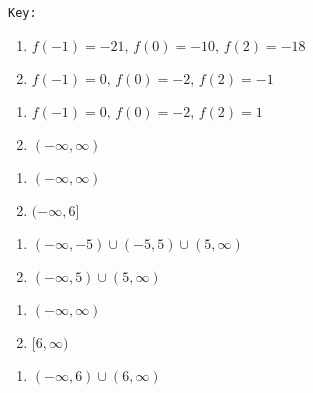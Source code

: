 \documentclass{article}
\newcounter{key}
\begin{document}
\vfill 

\dotfill \newline 
\texttt{Key:}
\begin{multicols}{2}
\begin{enumerate}   
    \item $f(-1) = -21, \, f(0) = -10, \, f(2) = -18$
    \item $f(-1) = 0, \, f(0) = -2, \, f(2) = -1$
\end{enumerate}     \setcounter{key}{\value{enumi}}
\end{multicols}
\begin{multicols}{2}
\begin{enumerate}   \setcounter{enumi}{\value{key}}
    \item $f(-1) = 0, \, f(0) = -2, \, f(2) = 1$ 
    \item $(-\infty, \infty)$
\end{enumerate} \setcounter{key}{\value{enumi}}
\end{multicols}
\begin{multicols}{2}
\begin{enumerate}   \setcounter{enumi}{\value{key}}
    \item $(-\infty, \infty)$ 
    \item $(-\infty, 6]$
\end{enumerate} \setcounter{key}{\value{enumi}}
\end{multicols}
\begin{multicols}{2}
\begin{enumerate}   \setcounter{enumi}{\value{key}}
    \item $(-\infty, -5) \cup (-5, 5) \cup (5, \infty)$ 
    \item $(-\infty, 5) \cup (5, \infty)$
\end{enumerate} \setcounter{key}{\value{enumi}}
\end{multicols}
\begin{multicols}{2}
\begin{enumerate}   \setcounter{enumi}{\value{key}}
    \item $(-\infty, \infty)$ 
    \item $[6, \infty)$
\end{enumerate} \setcounter{key}{\value{enumi}}
\end{multicols}
\begin{multicols}{2}
\begin{enumerate}   \setcounter{enumi}{\value{key}}
    \item $(-\infty, 6) \cup (6, \infty)$ 
\end{enumerate} \setcounter{key}{\value{enumi}}
\end{multicols}
\end{document}
